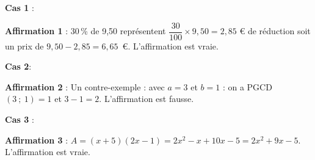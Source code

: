 
\medskip

%
%
 
\textbf{Cas 1 }: %

  
\textbf{Affirmation 1 }: %
 30\,\% de 9,50 représentent $\dfrac{30}{100} \times 9,50 = 2,85$
\euro{} de réduction soit un prix de $9,50 - 2,85 = 6,65$~\euro. L’affirmation est vraie.

\medskip
 
\textbf{Cas 2}: %

\textbf{Affirmation 2 } : %
Un contre-exemple : avec $a = 3$ et $b = 1$ : on a PGCD$(3~;~1) = 1$ et $3 - 1 = 2$. L’affirmation est fausse.
\medskip
 
\textbf{Cas 3 }: %

\textbf{Affirmation 3 }: %
$A = (x + 5)(2x - 1) = 2x^2 - x + 10x - 5 = 2x^2 + 9x - 5$. L’affirmation est vraie. 
\bigskip


